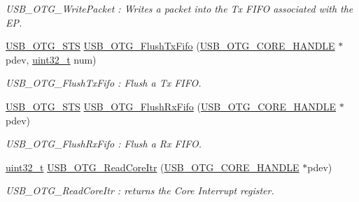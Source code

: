 \begin{DoxyCompactItemize}
\begin{DoxyCompactList}\small\item\em U\-S\-B\-\_\-\-O\-T\-G\-\_\-\-Write\-Packet \-: Writes a packet into the Tx F\-I\-F\-O associated with the E\-P. \end{DoxyCompactList}\item 
\hyperlink{group___u_s_b___c_o_r_e___exported___types_ga8b6504b9af0662f17515795db0f9c8ed}{U\-S\-B\-\_\-\-O\-T\-G\-\_\-\-S\-T\-S} \hyperlink{group___u_s_b___c_o_r_e___exported___functions_prototype_ga2558e8a44531a7053e74731e66a4a903}{U\-S\-B\-\_\-\-O\-T\-G\-\_\-\-Flush\-Tx\-Fifo} (\hyperlink{group___u_s_b___c_o_r_e___exported___types_gaf76054c11eb8a3367907aad7ae700e80}{U\-S\-B\-\_\-\-O\-T\-G\-\_\-\-C\-O\-R\-E\-\_\-\-H\-A\-N\-D\-L\-E} $\ast$pdev, \hyperlink{stdint_8h_a435d1572bf3f880d55459d9805097f62}{uint32\-\_\-t} num)
\begin{DoxyCompactList}\small\item\em U\-S\-B\-\_\-\-O\-T\-G\-\_\-\-Flush\-Tx\-Fifo \-: Flush a Tx F\-I\-F\-O. \end{DoxyCompactList}\item 
\hyperlink{group___u_s_b___c_o_r_e___exported___types_ga8b6504b9af0662f17515795db0f9c8ed}{U\-S\-B\-\_\-\-O\-T\-G\-\_\-\-S\-T\-S} \hyperlink{group___u_s_b___c_o_r_e___exported___functions_prototype_ga51e591e5eb2247277e8c13e864a9c02c}{U\-S\-B\-\_\-\-O\-T\-G\-\_\-\-Flush\-Rx\-Fifo} (\hyperlink{group___u_s_b___c_o_r_e___exported___types_gaf76054c11eb8a3367907aad7ae700e80}{U\-S\-B\-\_\-\-O\-T\-G\-\_\-\-C\-O\-R\-E\-\_\-\-H\-A\-N\-D\-L\-E} $\ast$pdev)
\begin{DoxyCompactList}\small\item\em U\-S\-B\-\_\-\-O\-T\-G\-\_\-\-Flush\-Rx\-Fifo \-: Flush a Rx F\-I\-F\-O. \end{DoxyCompactList}\item 
\hyperlink{stdint_8h_a435d1572bf3f880d55459d9805097f62}{uint32\-\_\-t} \hyperlink{group___u_s_b___c_o_r_e___exported___functions_prototype_ga178eb6ecc4c0514842c9bbb7ee783d21}{U\-S\-B\-\_\-\-O\-T\-G\-\_\-\-Read\-Core\-Itr} (\hyperlink{group___u_s_b___c_o_r_e___exported___types_gaf76054c11eb8a3367907aad7ae700e80}{U\-S\-B\-\_\-\-O\-T\-G\-\_\-\-C\-O\-R\-E\-\_\-\-H\-A\-N\-D\-L\-E} $\ast$pdev)
\begin{DoxyCompactList}\small\item\em U\-S\-B\-\_\-\-O\-T\-G\-\_\-\-Read\-Core\-Itr \-: returns the Core Interrupt register. \end{DoxyCompactList}\item 

\end{DoxyCompactItemize}
